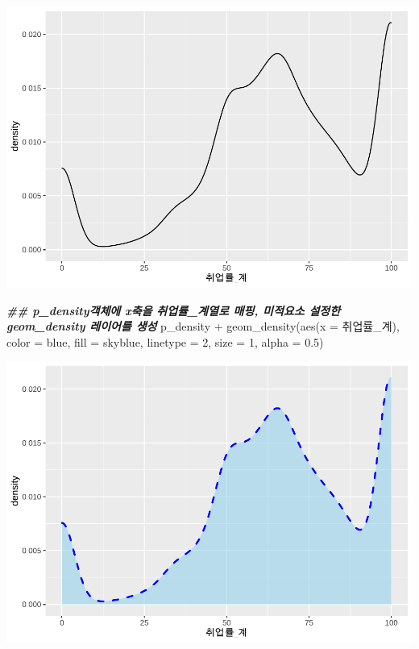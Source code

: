 \documentclass[
]{article}
\newenvironment{Shaded}{\begin{snugshade}}{\end{snugshade}}
\newcommand{\AttributeTok}[1]{\textcolor[rgb]{0.77,0.63,0.00}{#1}}
\newcommand{\DecValTok}[1]{\textcolor[rgb]{0.00,0.00,0.81}{#1}}
\newcommand{\DocumentationTok}[1]{\textcolor[rgb]{0.56,0.35,0.01}{\textbf{\textit{#1}}}}
\newcommand{\FloatTok}[1]{\textcolor[rgb]{0.00,0.00,0.81}{#1}}
\newcommand{\FunctionTok}[1]{\textcolor[rgb]{0.00,0.00,0.00}{#1}}
\newcommand{\NormalTok}[1]{#1}
\newcommand{\SpecialCharTok}[1]{\textcolor[rgb]{0.00,0.00,0.00}{#1}}
\newcommand{\StringTok}[1]{\textcolor[rgb]{0.31,0.60,0.02}{#1}}
\begin{document}
\includegraphics{chap3_files/figure-latex/unnamed-chunk-24-1.pdf}

\begin{Shaded}
\begin{Highlighting}[]
\DocumentationTok{\#\# p\_density객체에 x축을 \textquotesingle{}취업률\_계\textquotesingle{}열로 매핑, 미적요소 설정한 geom\_density 레이어를 생성}
\NormalTok{p\_density }\SpecialCharTok{+} 
  \FunctionTok{geom\_density}\NormalTok{(}\FunctionTok{aes}\NormalTok{(}\AttributeTok{x =}\NormalTok{ 취업률\_계), }\AttributeTok{color =} \StringTok{\textquotesingle{}blue\textquotesingle{}}\NormalTok{, }\AttributeTok{fill =} \StringTok{\textquotesingle{}skyblue\textquotesingle{}}\NormalTok{, }\AttributeTok{linetype =} \DecValTok{2}\NormalTok{, }\AttributeTok{size =} \DecValTok{1}\NormalTok{, }\AttributeTok{alpha =} \FloatTok{0.5}\NormalTok{)}
\end{Highlighting}
\end{Shaded}

\includegraphics{chap3_files/figure-latex/unnamed-chunk-24-2.pdf}
\end{document}
